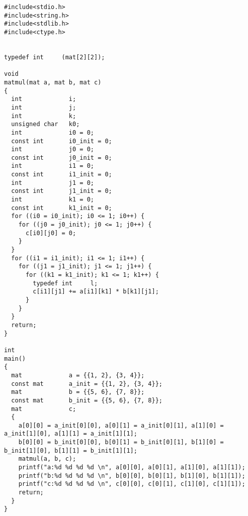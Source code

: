  \begin{verbatim}
#include<stdio.h>
#include<string.h>
#include<stdlib.h>
#include<ctype.h>


typedef int     (mat[2][2]);

void 
matmul(mat a, mat b, mat c)
{
  int             i;
  int             j;
  int             k;
  unsigned char   k0;
  int             i0 = 0;
  const int       i0_init = 0;
  int             j0 = 0;
  const int       j0_init = 0;
  int             i1 = 0;
  const int       i1_init = 0;
  int             j1 = 0;
  const int       j1_init = 0;
  int             k1 = 0;
  const int       k1_init = 0;
  for ((i0 = i0_init); i0 <= 1; i0++) {
    for ((j0 = j0_init); j0 <= 1; j0++) {
      c[i0][j0] = 0;
    }
  }
  for ((i1 = i1_init); i1 <= 1; i1++) {
    for ((j1 = j1_init); j1 <= 1; j1++) {
      for ((k1 = k1_init); k1 <= 1; k1++) {
        typedef int     l;
        c[i1][j1] += a[i1][k1] * b[k1][j1];
      }
    }
  }
  return;
}

int 
main()
{
  mat             a = {{1, 2}, {3, 4}};
  const mat       a_init = {{1, 2}, {3, 4}};
  mat             b = {{5, 6}, {7, 8}};
  const mat       b_init = {{5, 6}, {7, 8}};
  mat             c;
  {
    a[0][0] = a_init[0][0], a[0][1] = a_init[0][1], a[1][0] = a_init[1][0], a[1][1] = a_init[1][1];
    b[0][0] = b_init[0][0], b[0][1] = b_init[0][1], b[1][0] = b_init[1][0], b[1][1] = b_init[1][1];
    matmul(a, b, c);
    printf("a:%d %d %d %d \n", a[0][0], a[0][1], a[1][0], a[1][1]);
    printf("b:%d %d %d %d \n", b[0][0], b[0][1], b[1][0], b[1][1]);
    printf("c:%d %d %d %d \n", c[0][0], c[0][1], c[1][0], c[1][1]);
    return;
  }
}
\end{verbatim} 

